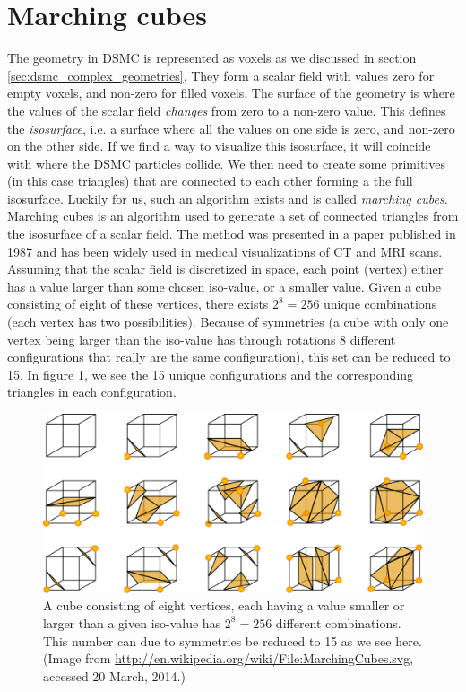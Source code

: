 \section{Marching cubes}
\label{sec:marching_cubes}
The geometry in DSMC is represented as voxels as we discussed in section \ref{sec:dsmc_complex_geometries}. They form a scalar field with values zero for empty voxels, and non-zero for filled voxels. The surface of the geometry is where the values of the scalar field \textit{changes} from zero to a non-zero value. This defines the \textit{isosurface}, i.e. a surface where all the values on one side is zero, and non-zero on the other side. If we find a way to visualize this isosurface, it will coincide with where the DSMC particles collide. We then need to create some primitives (in this case triangles) that are connected to each other forming a the full isosurface. Luckily for us, such an algorithm exists and is called \textit{marching cubes}.\\
Marching cubes is an algorithm used to generate a set of connected triangles from the isosurface of a scalar field. The method was presented in a paper published in 1987 and has been widely used in medical visualizations of CT and MRI scans\cite{wiki:marching_cubes}. Assuming that the scalar field is discretized in space, each point (vertex) either has a value larger than some chosen iso-value, or a smaller value. Given a cube consisting of eight of these vertices, there exists $2^{8}=256$ unique combinations (each vertex has two possibilities). Because of symmetries (a cube with only one vertex being larger than the iso-value has through rotations 8 different configurations that really are the same configuration), this set can be reduced to 15. In figure \ref{fig:vis_marching_cubes}, we see the 15 unique configurations and the corresponding triangles in each configuration.
\begin{figure}[h]
\begin{center}
\includegraphics[width=\textwidth, trim=0cm 0cm 0cm 0cm, clip]{visualization/figures/marching_cubes.png}
\end{center}
\caption{A cube consisting of eight vertices, each having a value smaller or larger than a given iso-value has $2^8=256$ different combinations. This number can due to symmetries be reduced to 15 as we see here. (Image from \url{http://en.wikipedia.org/wiki/File:MarchingCubes.svg}, accessed 20 March, 2014.)}
\label{fig:vis_marching_cubes}
\end{figure}
